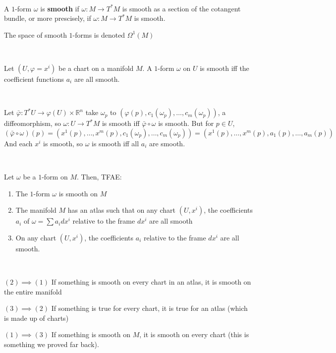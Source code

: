 \documentclass{article}
\begin{document}
\begin{definition}
  \

  A $1$-form $\omega$ is \textbf{smooth} if $\omega: M \to T^*M$ is smooth as a section of the cotangent bundle, or more prescisely, if $\omega: M \to T^*M$ is smooth.

  The space of smooth $1$-forms is denoted $\Omega^1(M)$
\end{definition}

\begin{lemma}
  \

  Let $(U,\varphi = x^i)$ be a chart on a manifold $M$. A $1$-form $\omega$ on $U$ is smooth iff the coefficient functions $a_i$ are all smooth.
\end{lemma}

\begin{customproof}
  \

  Let $\bar{\varphi}: T^*U \to \varphi(U) \times \mathbb{R}^n$ take $\omega_p$ to $(\varphi(p), c_1(\omega_p), \dots, c_m(\omega_p))$, a diffeomorphism, so $\omega: U \to T^*M$ is smooth iff $\bar{\varphi} \circ \omega$ is smooth. But for $p \in U$, $$(\bar{\varphi} \circ \omega)(p) = (x^1(p), \dots, x^m(p), c_1(\omega_p), \dots, c_m(\omega_p)) = (x^1(p),\dots, x^m(p), a_1(p),\dots, a_m(p))$$And each $x^i$ is smooth, so $\omega$ is smooth iff all $a_i$ are smooth.
\end{customproof}

\begin{proposition}
  \

  Let $\omega$ be a $1$-form on $M$. Then, TFAE:

  \begin{enumerate}
    \item The $1$-form $\omega$ is smooth on $M$
    \item The manifold $M$ has an atlas such that on any chart $(U, x^i)$, the coefficients $a_i$ of $\omega = \sum a_idx^i$ relative to the frame $dx^i$ are all smooth
    \item On any chart $(U, x^i)$, the coefficients $a_i$ relative to the frame $dx^i$ are all smooth.
  \end{enumerate}
\end{proposition}

\begin{customproof}
  \

  $(2) \implies (1)$ If something is smooth on every chart in an atlas, it is smooth on the entire manifold

  $(3) \implies (2)$ If something is true for every chart, it is true for an atlas (which is made up of charts)

  $(1) \implies (3)$ If something is smooth on $M$, it is smooth on every chart (this is something we proved far back).
\end{customproof}
\end{document}
